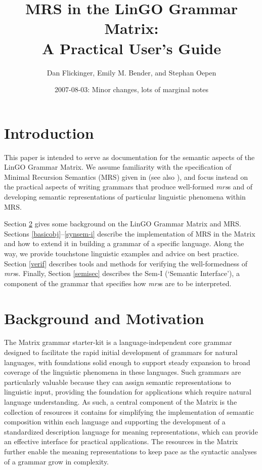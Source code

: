 \documentclass[12pt]{article}
\title{MRS in the LinGO Grammar Matrix:\\ A Practical User's Guide}
\author{Dan Flickinger, Emily M. Bender, and Stephan Oepen}
\date{2007-08-03: Minor changes, lots of marginal notes}
\begin{document}
\maketitle

\setcounter{tocdepth}{2}  %
\tableofcontents
\newpage
\section{Introduction}

This paper is intended to serve as documentation for the semantic
aspects of the LinGO Grammar Matrix. We assume familiarity with the
specification of Minimal Recursion Semantics (MRS) given in
 (see also ),
and focus instead on the practical aspects of writing grammars
that produce well-formed {\it mrs}s and of developing semantic
representations of particular linguistic phenomena within MRS.

Section \ref{backmot} gives some background on the LinGO Grammar
Matrix and MRS.  Sections \ref{basicobj}--\ref{synsem-i} describe
the implementation of MRS in the Matrix and how to extend it in
building a grammar of a specific language.  Along the way, we
provide touchstone linguistic examples and advice on best practice.
Section \ref{verif} describes tools
and methods for verifying the well-formedness of {\it mrs}s.  Finally,
Section \ref{semisec} describes the Sem-I (`Semantic Interface'), a component
of the grammar that specifies how {\it mrs}s are to be interpreted.

\section{Background and Motivation}
\label{backmot}

The Matrix grammar starter-kit
\cite{Ben:Fli:Oep:02,Fli:Ben:03,Ben:Fli:05,Dre:Ben:05} is a
language-independent core grammar designed to facilitate the rapid
initial development of grammars for natural languages, with
foundations solid enough to support steady expansion to broad coverage
of the linguistic phenomena in these languages.  Such grammars are
particularly valuable because they can assign semantic representations
to linguistic input, providing the foundation for applications which
require natural language understanding.  As such, a central component
of the Matrix is the collection of resources it contains for
simplifying the implementation of semantic composition within each
language and supporting the development of a standardized description
language for meaning representations, which can provide an effective
interface for practical applications.  The resources in the Matrix
further enable the meaning representations to keep pace as the
syntactic analyses of a grammar grow in complexity.
\end{document}
